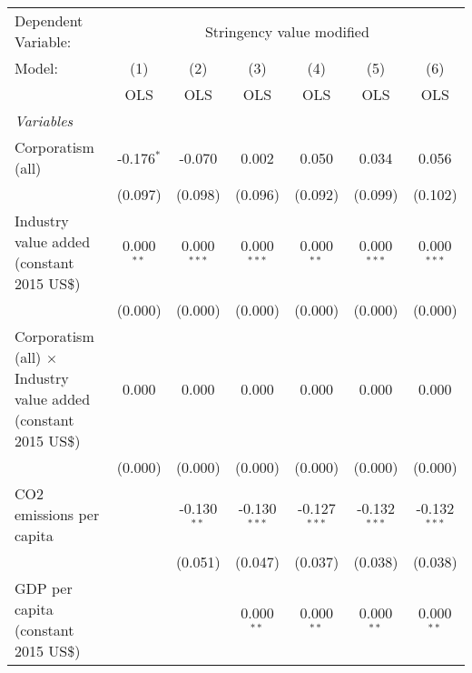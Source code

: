 
\begingroup
\centering
\begin{tabular}{lcccccc}
   \toprule
   Dependent Variable: & \multicolumn{6}{c}{Stringency value modified}\\
   Model:                                                                 & (1)          & (2)           & (3)            & (4)            & (5)            & (6)\\  
                                                                          &  OLS         & OLS           & OLS            & OLS            & OLS            & OLS\\  
   \midrule
   \emph{Variables}\\
   Corporatism (all)                                                      & -0.176$^{*}$ & -0.070        & 0.002          & 0.050          & 0.034          & 0.056\\   
                                                                          & (0.097)      & (0.098)       & (0.096)        & (0.092)        & (0.099)        & (0.102)\\   
   Industry value added (constant 2015 US\$)                              & 0.000$^{**}$ & 0.000$^{***}$ & 0.000$^{***}$  & 0.000$^{**}$   & 0.000$^{***}$  & 0.000$^{***}$\\   
                                                                          & (0.000)      & (0.000)       & (0.000)        & (0.000)        & (0.000)        & (0.000)\\   
   Corporatism (all) $\times$ Industry value added (constant 2015 US\$)   & 0.000        & 0.000         & 0.000          & 0.000          & 0.000          & 0.000\\   
                                                                          & (0.000)      & (0.000)       & (0.000)        & (0.000)        & (0.000)        & (0.000)\\   
   CO2 emissions per capita                                               &              & -0.130$^{**}$ & -0.130$^{***}$ & -0.127$^{***}$ & -0.132$^{***}$ & -0.132$^{***}$\\   
                                                                          &              & (0.051)       & (0.047)        & (0.037)        & (0.038)        & (0.038)\\   
   GDP per capita (constant 2015 US\$)                                    &              &               & 0.000$^{**}$   & 0.000$^{**}$   & 0.000$^{**}$   & 0.000$^{**}$\\   

\end{tabular}
